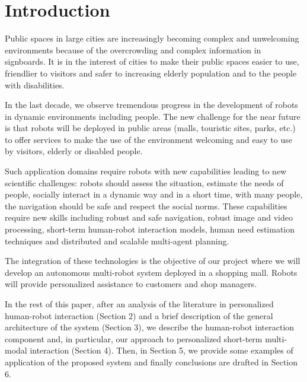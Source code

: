 \section{Introduction}

Public spaces in large cities are increasingly becoming complex and unwelcoming environments because of the overcrowding and complex information in signboards. It is in the interest of cities to make their public spaces easier to use, friendlier to visitors and safer to increasing elderly population and to the people with disabilities.

In the last decade, we observe tremendous progress in the development of robots in dynamic environments %
including people. The new challenge for the near future is that robots will be deployed in public areas (malls, touristic sites, parks, etc.) to offer services to make the use of the environment welcoming and easy to use by visitors, elderly or disabled people. 

Such application domains require robots with new capabilities leading to new scientific challenges: robots should assess the situation, estimate the needs of people, socially interact in a dynamic way and in a short time, with many people, the navigation should be safe and respect the social norms. These capabilities require new skills including robust and safe navigation, robust image and video processing, short-term human-robot interaction models, human need estimation techniques and distributed and scalable multi-agent planning.

The integration of these technologies is the objective of our project \coaches where we will develop an autonomous multi-robot system deployed in a shopping mall. Robots will provide personalized assistance to customers and shop managers.

In the rest of this paper, after an analysis of the literature in personalized human-robot interaction (Section 2) and a brief description of the general architecture of the \coaches system (Section 3), we describe the human-robot interaction component and, in particular, our approach to personalized short-term multi-modal interaction (Section 4). Then, in Section 5, we provide some examples of application of the proposed system and finally conclusions are drafted in Section 6.

